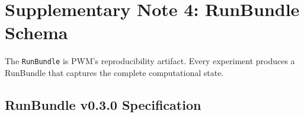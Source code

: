 \documentclass[11pt]{article}
\theoremstyle{definition}
\begin{document}
\newpage

\section{Supplementary Note 4: RunBundle Schema}
\label{sec:runbundle}

The \texttt{RunBundle} is PWM's reproducibility artifact.  Every experiment
produces a RunBundle that captures the complete computational state.

\subsection{RunBundle v0.3.0 Specification}
\end{document}

